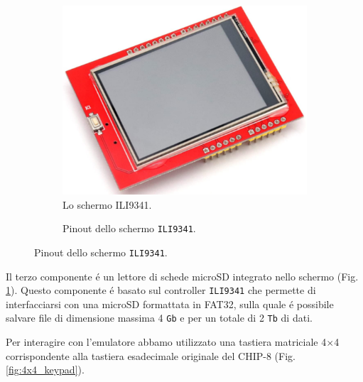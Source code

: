 \documentclass[a4paper]{article}
\begin{document}
\begin{figure}[h]
    \begin{subfigure}[b]{0.45\textwidth}
        \begin{center}
            \includegraphics[scale=0.30]{figures/ili9341.png}
        \end{center}
        \caption{Lo schermo ILI9341.}
        \label{fig:ili9341}
    \end{subfigure}
    \hfill
    \begin{subfigure}[b]{0.45\textwidth}
        \begin{center}
            \begin{tikzpicture}[x=0.015cm, y=0.015cm, scale=0.65, transform shape]
                
            \end{tikzpicture}
        \end{center}
        \caption{Pinout dello schermo \texttt{ILI9341}.}
        \label{fig:pinout_ili}
    \end{subfigure}
\end{figure}

Il terzo componente é un lettore di schede microSD integrato nello schermo
(Fig. \ref{fig:ili9341}). Questo componente é basato sul controller
\texttt{ILI9341} che permette di interfacciarsi con una microSD formattata in
FAT32, sulla quale é possibile salvare file di dimensione massima 4 \texttt{Gb}
e per un totale di 2 \texttt{Tb} di dati.

Per interagire con l'emulatore abbamo utilizzato una tastiera matriciale 4$\times$4
corrispondente alla tastiera esadecimale originale del CHIP-8 (Fig. \ref{fig:4x4_keypad}).
\end{document}
